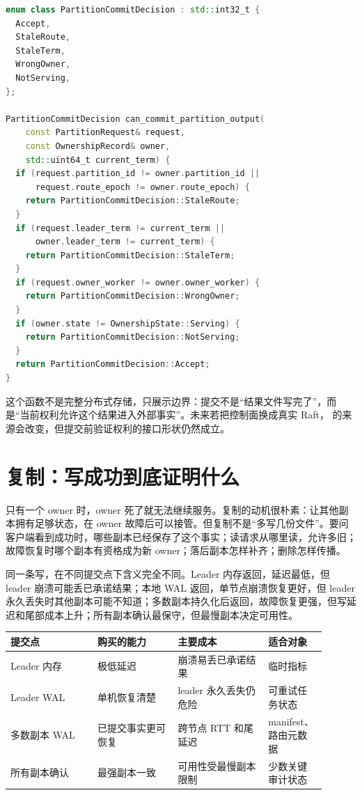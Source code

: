 \begin{lstlisting}[language=C++,caption={提交前验证所有权和任期}]
enum class PartitionCommitDecision : std::int32_t {
  Accept,
  StaleRoute,
  StaleTerm,
  WrongOwner,
  NotServing,
};

PartitionCommitDecision can_commit_partition_output(
    const PartitionRequest& request,
    const OwnershipRecord& owner,
    std::uint64_t current_term) {
  if (request.partition_id != owner.partition_id ||
      request.route_epoch != owner.route_epoch) {
    return PartitionCommitDecision::StaleRoute;
  }
  if (request.leader_term != current_term ||
      owner.leader_term != current_term) {
    return PartitionCommitDecision::StaleTerm;
  }
  if (request.owner_worker != owner.owner_worker) {
    return PartitionCommitDecision::WrongOwner;
  }
  if (owner.state != OwnershipState::Serving) {
    return PartitionCommitDecision::NotServing;
  }
  return PartitionCommitDecision::Accept;
}
\end{lstlisting}

这个函数不是完整分布式存储，只展示边界：提交不是“结果文件写完了”，而是“当前权利允许这个结果进入外部事实”。未来若把控制面换成真实 Raft， 的来源会改变，但提交前验证权利的接口形状仍然成立。

\section{复制：写成功到底证明什么}

只有一个 owner 时，owner 死了就无法继续服务。复制的动机很朴素：让其他副本拥有足够状态，在 owner 故障后可以接管。但复制不是“多写几份文件”。要问客户端看到成功时，哪些副本已经保存了这个事实；读请求从哪里读，允许多旧；故障恢复时哪个副本有资格成为新 owner；落后副本怎样补齐；删除怎样传播。

同一条写，在不同提交点下含义完全不同。Leader 内存返回，延迟最低，但 leader 崩溃可能丢已承诺结果；本地 WAL 返回，单节点崩溃恢复更好，但 leader 永久丢失时其他副本可能不知道；多数副本持久化后返回，故障恢复更强，但写延迟和尾部成本上升；所有副本确认最保守，但最慢副本决定可用性。

\begin{center}
\small
\begin{tabular}{@{}p{0.26\linewidth}p{0.24\linewidth}p{0.27\linewidth}p{0.13\linewidth}@{}}
\toprule
提交点 & 购买的能力 & 主要成本 & 适合对象 \\
\midrule
Leader 内存 & 极低延迟 & 崩溃易丢已承诺结果 & 临时指标 \\
Leader WAL & 单机恢复清楚 & leader 永久丢失仍危险 & 可重试任务状态 \\
多数副本 WAL & 已提交事实更可恢复 & 跨节点 RTT 和尾延迟 & manifest、路由元数据 \\
所有副本确认 & 最强副本一致 & 可用性受最慢副本限制 & 少数关键审计状态 \\
\bottomrule
\end{tabular}
\end{center}

